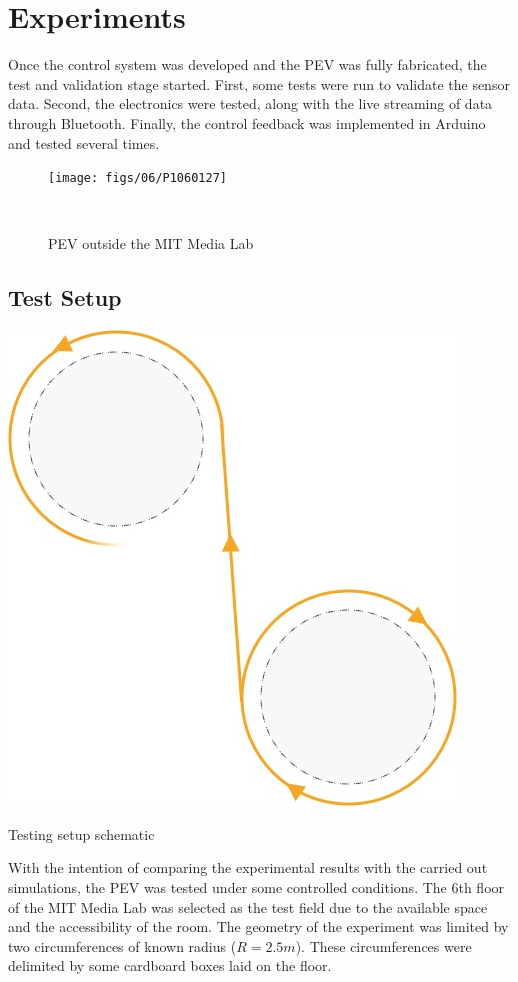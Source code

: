 
\newpage
\section{Experiments}

Once the control system was developed and the PEV was fully fabricated, the test and validation stage started. First, some tests were run to validate the sensor data. Second, the electronics were tested, along with the live streaming of data through Bluetooth. Finally, the control feedback was implemented in Arduino and tested several times.

\begin{figure}[!h]
	\texttt{[image: figs/06/P1060127]}
	\caption{PEV outside the MIT Media Lab}
	\\[-1.2cm]
\end{figure}
\subsection{Test Setup}

\begin{marginfigure}[6cm]
	\includegraphics[width=1\linewidth]{figs/06/circuit}
	\caption{Testing setup schematic}
\end{marginfigure}
With the intention of comparing the experimental results with the carried out simulations, the PEV was tested under some controlled conditions. The 6th floor of the MIT Media Lab was selected as the test field due to the available space and the accessibility of the room. The geometry of the experiment was limited by two circumferences of known radius ($R=2.5m$). These circumferences were delimited by some cardboard boxes laid on the floor.

